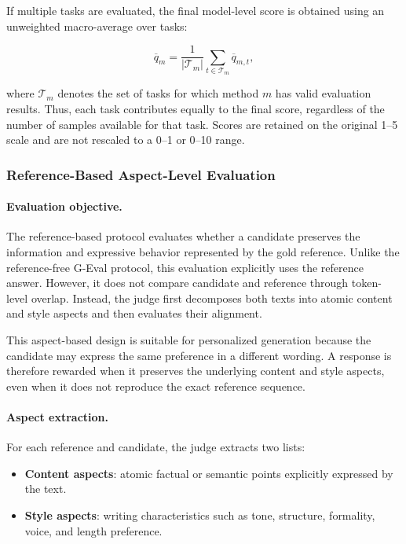 \documentclass{article} %
\begin{document}
If multiple tasks are evaluated, the final model-level score is obtained using an unweighted macro-average over tasks:

\begin{equation}
\overline{q}_{m}
=
\frac{1}{|\mathcal{T}_m|}
\sum_{t\in\mathcal{T}_m}
\overline{q}_{m,t},
\end{equation}

where $\mathcal{T}_m$ denotes the set of tasks for which method $m$ has valid evaluation results. Thus, each task contributes equally to the final score, regardless of the number of samples available for that task. Scores are retained on the original 1--5 scale and are not rescaled to a 0--1 or 0--10 range.

\subsubsection{Reference-Based Aspect-Level Evaluation}

\paragraph{Evaluation objective.}
The reference-based protocol evaluates whether a candidate preserves the information and expressive behavior represented by the gold reference. Unlike the reference-free G-Eval protocol, this evaluation explicitly uses the reference answer. However, it does not compare candidate and reference through token-level overlap. Instead, the judge first decomposes both texts into atomic content and style aspects and then evaluates their alignment.

This aspect-based design is suitable for personalized generation because the candidate may express the same preference in a different wording. A response is therefore rewarded when it preserves the underlying content and style aspects, even when it does not reproduce the exact reference sequence.

\paragraph{Aspect extraction.}
For each reference and candidate, the judge extracts two lists:

\begin{itemize}
    \item \textbf{Content aspects}: atomic factual or semantic points explicitly expressed by the text.
    \item \textbf{Style aspects}: writing characteristics such as tone, structure, formality, voice, and length preference.
\end{itemize}
\end{document}

